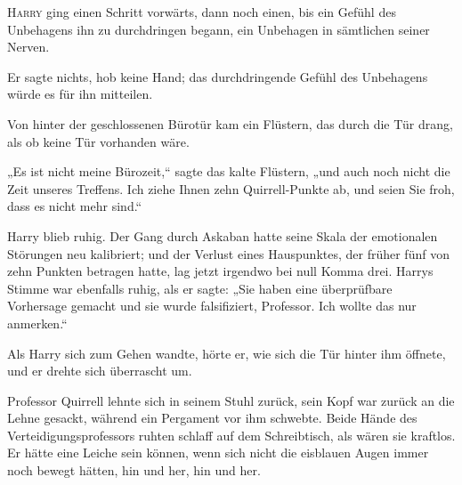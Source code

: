 
\lettrine{H}{arry} ging einen Schritt vorwärts, dann noch einen, bis ein Gefühl des Unbehagens ihn zu durchdringen begann, ein Unbehagen in sämtlichen seiner Nerven.

Er sagte nichts, hob keine Hand; das durchdringende Gefühl des Unbehagens würde es für ihn mitteilen.

Von hinter der geschlossenen Bürotür kam ein Flüstern, das durch die Tür drang, als ob keine Tür vorhanden wäre.

„Es ist nicht meine Bürozeit,“ sagte das kalte Flüstern, „und auch noch nicht die Zeit unseres Treffens. Ich ziehe Ihnen zehn Quirrell-Punkte ab, und seien Sie froh, dass es nicht mehr sind.“

Harry blieb ruhig. Der Gang durch Askaban hatte seine Skala der emotionalen Störungen neu kalibriert; und der Verlust eines Hauspunktes, der früher fünf von zehn Punkten betragen hatte, lag jetzt irgendwo bei null Komma drei. Harrys Stimme war ebenfalls ruhig, als er sagte: „Sie haben eine überprüfbare Vorhersage gemacht und sie wurde falsifiziert, Professor. Ich wollte das nur anmerken.“

Als Harry sich zum Gehen wandte, hörte er, wie sich die Tür hinter ihm öffnete, und er drehte sich überrascht um.

Professor Quirrell lehnte sich in seinem Stuhl zurück, sein Kopf war zurück an die Lehne gesackt, während ein Pergament vor ihm schwebte. Beide Hände des Verteidigungsprofessors ruhten schlaff auf dem Schreibtisch, als wären sie kraftlos. Er hätte eine Leiche sein können, wenn sich nicht die eisblauen Augen immer noch bewegt hätten, hin und her, hin und her.

